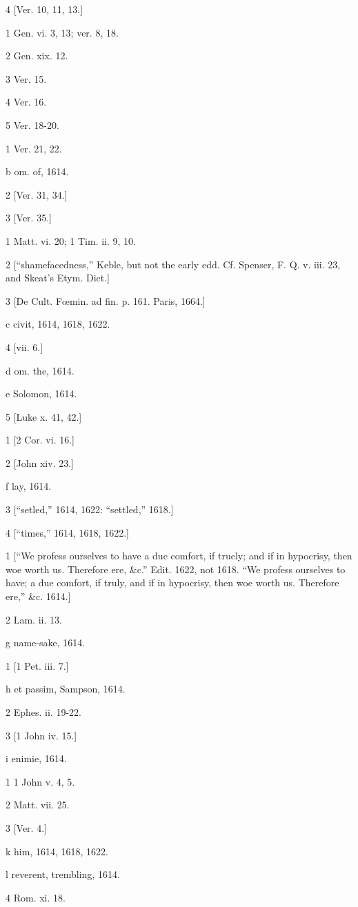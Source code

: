 4
[Ver. 10, 11, 13.]

1
Gen. vi. 3, 13; ver. 8, 18.

2
Gen. xix. 12.

3
Ver. 15.

4
Ver. 16.

5
Ver. 18-20.

1
Ver. 21, 22.

b
om. of, 1614.

2
[Ver. 31, 34.]

3
[Ver. 35.]

1
Matt. vi. 20; 1 Tim. ii. 9, 10.

2
[“shamefacedness,” Keble, but not the early edd. Cf. Spenser, F. Q. v. iii. 23, and Skeat’s Etym. Dict.]

3
[De Cult. Fœmin. ad fin. p. 161. Paris, 1664.]

c
civit, 1614, 1618, 1622.

4
[vii. 6.]

d
om. the, 1614.

e
Solomon, 1614.

5
[Luke x. 41, 42.]

1
[2 Cor. vi. 16.]

2
[John xiv. 23.]

f
lay, 1614.

3
[“setled,” 1614, 1622: “settled,” 1618.]

4
[“times,” 1614, 1618, 1622.]

1
[“We profess ourselves to have a due comfort, if truely; and if in hypocrisy, then woe worth us. Therefore ere, &c.” Edit. 1622, not 1618. “We profess ourselves to have; a due comfort, if truly, and if in hypocrisy, then woe worth us. Therefore ere,” &c. 1614.]

2
Lam. ii. 13.

g
name-sake, 1614.

1
[1 Pet. iii. 7.]

h
et passim, Sampson, 1614.

2
Ephes. ii. 19-22.

3
[1 John iv. 15.]

i
enimie, 1614.

1
1 John v. 4, 5.

2
Matt. vii. 25.

3
[Ver. 4.]

k
him, 1614, 1618, 1622.

l
reverent, trembling, 1614.

4
Rom. xi. 18.

